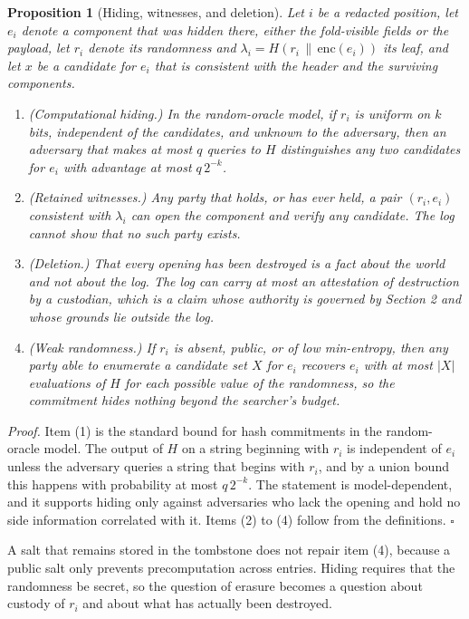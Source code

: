 \documentclass[11pt]{article}
\theoremstyle{plain}
\newtheorem{proposition}{Proposition}
\theoremstyle{definition}
\theoremstyle{remark}
\begin{document}
\begin{proposition}[Hiding, witnesses, and deletion]
Let $i$ be a redacted position, let $e_i$ denote a component that was hidden there, either the fold-visible fields or the payload, let $r_i$ denote its randomness and $\lambda_i=H(r_i\,\|\,\mathrm{enc}(e_i))$ its leaf, and let $x$ be a candidate for $e_i$ that is consistent with the header and the surviving components.
\begin{enumerate}
\item (Computational hiding.) In the random-oracle model, if $r_i$ is uniform on $k$ bits, independent of the candidates, and unknown to the adversary, then an adversary that makes at most $q$ queries to $H$ distinguishes any two candidates for $e_i$ with advantage at most $q\,2^{-k}$.
\item (Retained witnesses.) Any party that holds, or has ever held, a pair $(r_i,e_i)$ consistent with $\lambda_i$ can open the component and verify any candidate. The log cannot show that no such party exists.
\item (Deletion.) That every opening has been destroyed is a fact about the world and not about the log. The log can carry at most an attestation of destruction by a custodian, which is a claim whose authority is governed by Section 2 and whose grounds lie outside the log.
\item (Weak randomness.) If $r_i$ is absent, public, or of low min-entropy, then any party able to enumerate a candidate set $X$ for $e_i$ recovers $e_i$ with at most $|X|$ evaluations of $H$ for each possible value of the randomness, so the commitment hides nothing beyond the searcher's budget.
\end{enumerate}
\end{proposition}
\emph{Proof.} Item (1) is the standard bound for hash commitments in the random-oracle model. The output of $H$ on a string beginning with $r_i$ is independent of $e_i$ unless the adversary queries a string that begins with $r_i$, and by a union bound this happens with probability at most $q\,2^{-k}$. The statement is model-dependent, and it supports hiding only against adversaries who lack the opening and hold no side information correlated with it. Items (2) to (4) follow from the definitions. \hfill$\square$

A salt that remains stored in the tombstone does not repair item (4), because a public salt only prevents precomputation across entries. Hiding requires that the randomness be secret, so the question of erasure becomes a question about custody of $r_i$ and about what has actually been destroyed.
\end{document}
